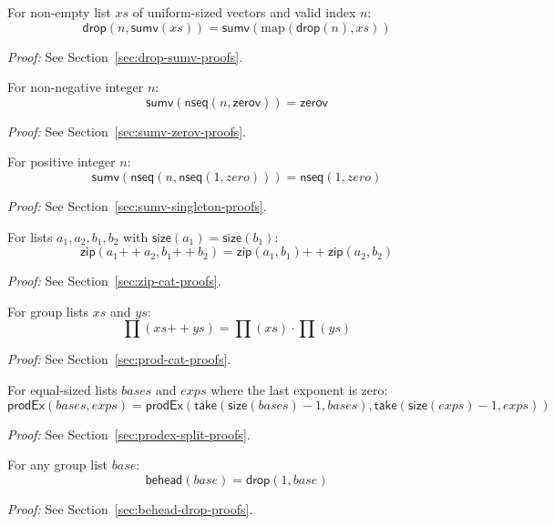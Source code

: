 \begin{lemma}
\label{lem:drop-sumv}
For non-empty list $xs$ of uniform-sized vectors and valid index $n$:
\[
\mathsf{drop}(n, \mathsf{sumv}(xs)) = \mathsf{sumv}(\text{map}(\mathsf{drop}(n), xs))
\]
\end{lemma}
\noindent \textit{Proof:} See Section~\ref{sec:drop-sumv-proofs}.

\begin{lemma}
\label{lem:sumv-nseq-zerov}
For non-negative integer $n$:
\[
\mathsf{sumv}(\mathsf{nseq}(n, \mathsf{zerov})) = \mathsf{zerov}
\]
\end{lemma}
\noindent \textit{Proof:} See Section~\ref{sec:sumv-zerov-proofs}.

\begin{lemma}
\label{lem:sumv-nseq-zero-singleton}
For positive integer $n$:
\[
\mathsf{sumv}(\mathsf{nseq}(n, \mathsf{nseq}(1, zero))) = \mathsf{nseq}(1, zero)
\]
\end{lemma}
\noindent \textit{Proof:} See Section~\ref{sec:sumv-singleton-proofs}.

\begin{lemma}
\label{lem:zip-cat-distributive}
For lists $a_1, a_2, b_1, b_2$ with $\mathsf{size}(a_1) = \mathsf{size}(b_1)$:
\[
\mathsf{zip}(a_1 \mathbin{++} a_2, b_1 \mathbin{++} b_2) = \mathsf{zip}(a_1, b_1) \mathbin{++} \mathsf{zip}(a_2, b_2)
\]
\end{lemma}
\noindent \textit{Proof:} See Section~\ref{sec:zip-cat-proofs}.

\begin{lemma}
\label{lem:prod-cat}
For group lists $xs$ and $ys$:
\[
\prod(xs \mathbin{++} ys) = \prod(xs) \cdot \prod(ys)
\]
\end{lemma}
\noindent \textit{Proof:} See Section~\ref{sec:prod-cat-proofs}.

\begin{lemma}
\label{lem:prodex-split-last-zero}
For equal-sized lists $bases$ and $exps$ where the last exponent is zero:
\[
\mathsf{prodEx}(bases, exps) = \mathsf{prodEx}(\mathsf{take}(\mathsf{size}(bases)-1, bases), \mathsf{take}(\mathsf{size}(exps)-1, exps))
\]
\end{lemma}
\noindent \textit{Proof:} See Section~\ref{sec:prodex-split-proofs}.

\begin{lemma}
\label{lem:behead-drop}
For any group list $base$:
\[
\mathsf{behead}(base) = \mathsf{drop}(1, base)
\]
\end{lemma}
\noindent \textit{Proof:} See Section~\ref{sec:behead-drop-proofs}.